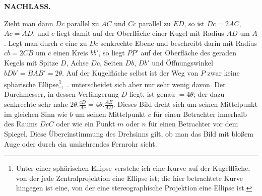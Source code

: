 \clearpage
\noindent{}\hfill{\small\textbf{NACHLASS.}}\hfill\null\par
\begin{center}
\end{center}
Zieht man dann $Dc$ parallel zu $AC$ und $Cc$ parallel zu $ED$, so ist
$Dc=2AC$, $Ac=AD$, und $c$ liegt damit auf der Oberfläche einer Kugel mit
Radius $AD$ um $A$. Legt man durch $c$ eine zu $Dc$ senkrechte Ebene und
beschreibt darin mit Radius $cb=2CB$ um $c$ einen Kreis $bb'$, so liegt
$PP'$ auf der Oberfläche des geraden Kegels mit Spitze $D$, Achse $Dc$, Seiten
$Db$, $Db'$ und Öffnungswinkel $bDb'=BAB'=2\theta$. Auf der Kugelfläche
selbst ist der Weg von $P$ zwar keine sphärische Ellipse\begingroup\renewcommand{\thefootnote}{*)}\footnote{Unter einer sphärischen Ellipse verstehe ich eine Kurve auf der Kugelfläche, von der jede Zentralprojektion eine Ellipse ist; die hier betrachtete Kurve hingegen ist eine, von der eine stereographische Projektion eine Ellipse ist.}\endgroup,\ .
unterscheidet sich aber nur sehr wenig davon. Der Durchmesser, in dessen
Verlängerung $D$ liegt, ist genau $=4\theta$; der dazu senkrechte sehr nahe
$2\theta.\frac{cD}{Ac}=4\theta.\frac{AE}{AD}$. Dieses Bild dreht sich um seinen
Mittelpunkt im gleichen Sinn wie $b$ um seinen Mittelpunkt $c$ für einen
Betrachter innerhalb des Raums $DcC$ oder wie ein Punkt $m$ oder $n$ für einen
Betrachter vor dem Spiegel. Diese Übereinstimmung des Drehsinns gilt, ob man
das Bild mit bloßem Auge oder durch ein umkehrendes Fernrohr sieht.

